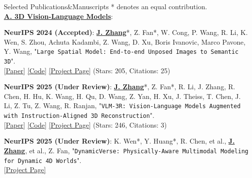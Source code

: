 \documentclass{resume} %
\begin{document}
\vspace{-1mm}

\begin{rSection}{Selected Publications\&Manuscripts}
\vspace{-1mm}
\small{* denotes an equal contribution.} \\
\textbf{\underline{A. 3D Vision-Language Models}}:

{ {\bf NeurIPS 2024  (Accepted)}}:
\underline{\textbf{J. Zhang}}*, Z. Fan*, W. Cong, P. Wang, R. Li, K. Wen, S. Zhou, Achuta Kadambi, Z. Wang, D. Xu, Boris Ivanovic, Marco Pavone, Y. Wang,
 "{\texttt{Large Spatial Model: End-to-end Unposed Images to Semantic 3D}}".
\\ \hspace{1em} {\color{BlueViolet} \href{https://arxiv.org/abs/2410.18956}{[\underline{Paper}]} \hspace{1em} \href{https://github.com/NVlabs/LSM}{[\underline{Code}]} \hspace{1em} \href{https://largespatialmodel.github.io/}{[\underline{Project Page}]}} \hspace{1em} (Stars: 205, Citations: 25)
\vspace{-1mm}

{ {\bf NeurIPS 2025 (Under Review)}}:
\underline{\textbf{J. Zhang}}*, Z. Fan*, R. Li, J. Zhang, R. Chen, H. Hu, K. Wang, H. Qu, D. Wang, Z. Yan, H. Xu, J. Theiss, T. Chen, J. Li, Z. Tu, Z. Wang, R. Ranjan, "{\texttt{VLM-3R: Vision-Language Models Augmented with Instruction-Aligned 3D Reconstruction}}".
\\ \hspace{1em} {\color{BlueViolet} \href{https://arxiv.org/abs/2505.20279}{[\underline{Paper}]} \hspace{1em} \href{https://github.com/VITA-Group/VLM-3R}{[\underline{Code}]} \hspace{1em} \href{https://vlm-3r.github.io/}{[\underline{Project Page}]}} \hspace{1em} (Stars: 246, Citations: 3)
\vspace{-1mm}

{ {\bf NeurIPS 2025 (Under Review)}}:
K. Wen*, Y. Huang*, R. Chen, et al., \underline{\textbf{J. Zhang}}, et al., Z. Fan, "{\texttt{DynamicVerse: Physically-Aware Multimodal Modeling for Dynamic 4D Worlds}}".
\\ \hspace{1em} {\color{BlueViolet} \href{https://dynamic-verse.github.io/}{[\underline{Project Page}]}}
\vspace{-1mm}


\end{rSection}
\end{document}
